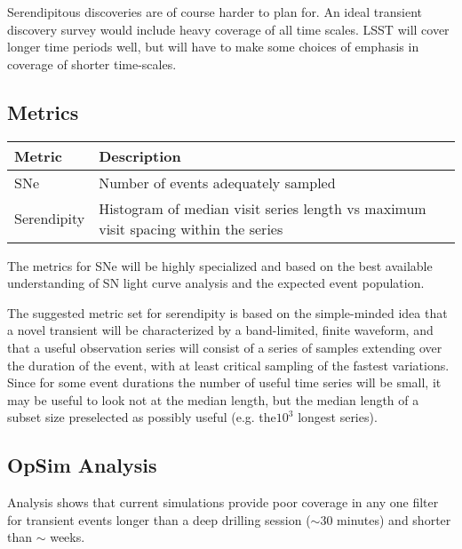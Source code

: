 Serendipitous discoveries are of course harder to plan for.  An ideal transient discovery survey would include heavy coverage of all time scales. LSST will cover longer time periods well, but will have to make some choices of emphasis in coverage of shorter time-scales.




\subsection{Metrics}
\label{sec:\secname:metrics}

\begin{center}
\begin{tabular}{| p{5cm} |p{10cm} |}
\hline Metric & Description\\
\hline
SNe & Number of events adequately sampled\\
Serendipity & Histogram of median visit series length vs maximum visit spacing within the series\\
  \hline \end{tabular}
 \end{center}

The metrics for SNe will be highly specialized and based on the best available understanding of SN light curve analysis and the expected event population.

The suggested metric set for serendipity is based on the simple-minded idea that a novel transient will be characterized by a band-limited, finite waveform, and that a useful observation series will consist of a series of samples extending over the duration of the event, with at least critical sampling of the fastest variations.  Since for some event durations the number of useful time series will be small, it may be useful to look not at the median length, but the median length of a subset size preselected as possibly useful (e.g. the$10^3$ longest series).


\subsection{OpSim Analysis}
\label{sec:\secname:analysis}

Analysis shows that current simulations provide  poor coverage in any one filter for transient events longer than a deep drilling session ($\sim$30 minutes) and shorter than $\sim$ weeks.

